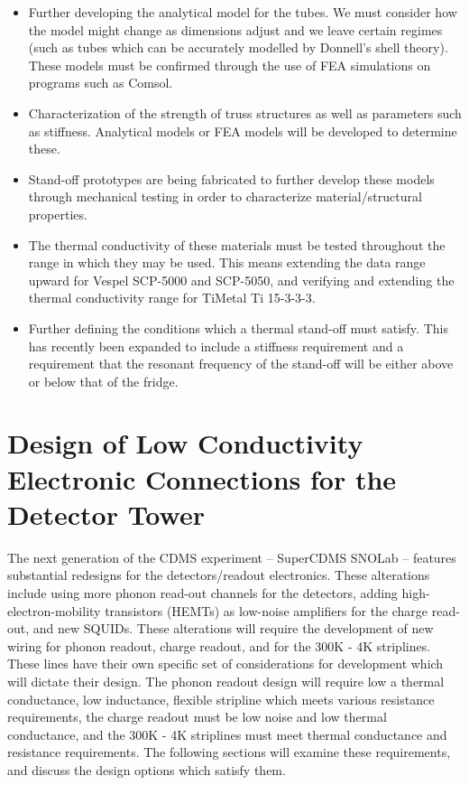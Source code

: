\documentclass{report}
\begin{document}
\begin{itemize}
\item Further developing the analytical model for the tubes. We must consider how the model might change as dimensions adjust and we leave certain regimes (such as tubes which can be accurately modelled by Donnell's shell theory). These models must be confirmed through the use of FEA simulations on programs such as Comsol.
\item Characterization of the strength of truss structures as well as parameters such as stiffness. Analytical models or FEA models will be developed to determine these.
\item Stand-off prototypes are being fabricated to further develop these models through mechanical testing in order to characterize material/structural properties.
\item The thermal conductivity of these materials must be tested throughout the range in which they may be used. This means extending the data range upward for Vespel SCP-5000 and SCP-5050, and verifying and extending the thermal conductivity range for TiMetal Ti 15-3-3-3.
\item Further defining the conditions which a thermal stand-off must satisfy. This has recently been expanded to include a stiffness requirement and a requirement that the resonant frequency of the stand-off will be either above or below that of the fridge.
\end{itemize}


\chapter{Design of Low Conductivity Electronic Connections for the Detector Tower}

The next generation of the CDMS experiment -- SuperCDMS SNOLab -- features substantial redesigns for the detectors/readout electronics. These alterations include using more phonon read-out channels for the detectors, adding high-electron-mobility transistors (HEMTs) as low-noise amplifiers for the charge read-out, and new SQUIDs. These alterations will require the development of new wiring for phonon readout, charge readout, and for the 300K - 4K striplines. These lines have their own specific set of considerations for development which will dictate their design. The phonon readout design will require low a thermal conductance, low inductance, flexible stripline which meets various resistance requirements, the charge readout must be low noise and low thermal conductance, and the 300K - 4K striplines must meet thermal conductance and resistance requirements. The following sections will examine these requirements, and discuss the design options which satisfy them.
\end{document}
